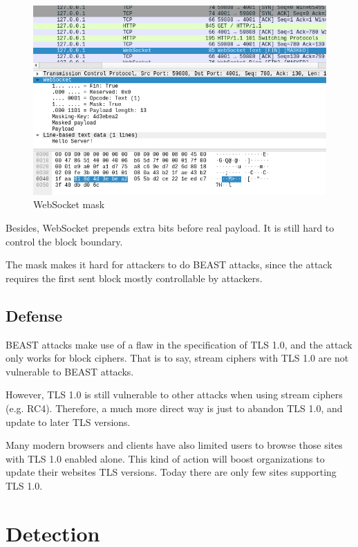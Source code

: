 \documentclass{acm_proc_article-sp}
\begin{document}
\begin{figure}[htb]
    \centering
    \includegraphics[keepaspectratio, width=\linewidth]{./figures/websocket-mask.png}
    \caption{WebSocket mask}
    \label{fig:websocket-mask}
\end{figure}

Besides, WebSocket prepends extra bits before real payload. It is still hard to
control the block boundary.

The mask makes it hard for attackers to do BEAST attacks, since the attack requires
the first sent block mostly controllable by attackers.

\subsection{Defense}
BEAST attacks make use of a flaw in the specification of TLS 1.0, and the attack only
works for block ciphers. That is to say, stream ciphers with TLS 1.0 are not
vulnerable to BEAST attacks.

However, TLS 1.0 is still vulnerable to other attacks when using stream ciphers (e.g. RC4).
Therefore, a much more direct way is just to abandon TLS 1.0, and update to later TLS
versions.

Many modern browsers and clients have also limited users to browse those sites
with TLS 1.0 enabled alone. This kind of action will boost organizations to update their
websites TLS versions. Today there are only few sites supporting TLS 1.0.

\section{Detection}
\end{document}
